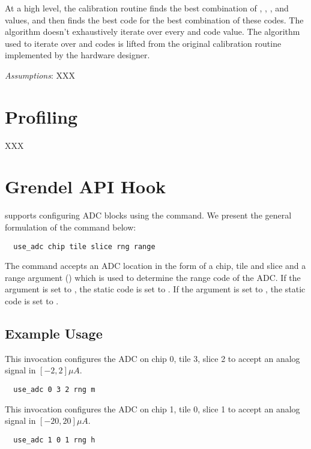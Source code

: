 At a high level, the calibration routine finds the best combination of
, , ,  and  values, and
then finds the best  code for the best combination of these codes.
The algorithm doesn't exhaustively iterate over every  and 
code value. The algorithm used to iterate over  and  codes
is lifted from the original calibration routine implemented by the hardware
designer.

\noindent\textit{Assumptions}: XXX

\section{Profiling}

XXX

\section{Grendel API Hook}

\grendel supports configuring ADC blocks using the  command. We
present the general formulation of the  command below:

\begin{lstlisting}
  use_adc chip tile slice rng range
\end{lstlisting}

The  command accepts an ADC location in the form of a chip, tile and
slice and a range argument () which is used to determine the range
\static code of the ADC.  If the  argument is set to , the
 static code is set to . If the  argument is
set to , the  static code is set to .

\subsection{Example Usage}

This invocation configures the ADC on chip 0, tile 3, slice 2 to accept an
analog signal in $[-2,2] \mu A$.

\begin{lstlisting}
  use_adc 0 3 2 rng m 
\end{lstlisting}


This invocation configures the ADC on chip 1, tile 0, slice 1 to accept an
analog signal in $[-20,20] \mu A$.

\begin{lstlisting}
  use_adc 1 0 1 rng h
\end{lstlisting}